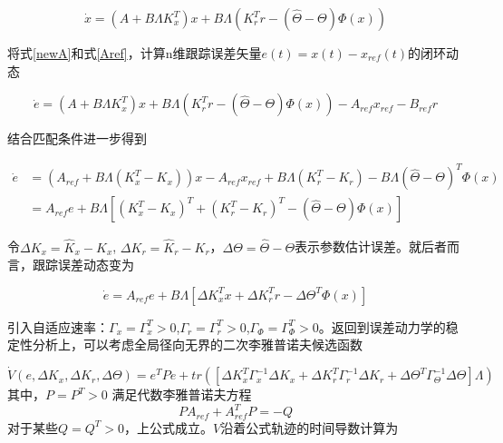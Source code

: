 \begin{equation}
\label{newA}
\dot x = (A + B\Lambda K_x^T)x + B\Lambda \left( {K_r^Tr - (\hat \Theta  - \Theta )\Phi \left( x \right)} \right)
\end{equation}

将式\ref{newA}和式\ref{Aref}，计算n维跟踪误差矢量$e(t)=x(t)-x_{ref}(t)$的闭环动态

\begin{equation}
\dot e = \left( {A + B\Lambda K_x^T} \right)x + B\Lambda \left( {K_r^Tr - (\hat \Theta  - \Theta )\Phi \left( x \right)} \right) - {A_{ref}}{x_{ref}} - {B_{ref}}r
\end{equation}

结合匹配条件进一步得到

\begin{equation}
\begin{split}
 \dot{e} &= \left( {{A_{ref}} + B\Lambda \left( {K_x^T - {K_x}} \right)} \right)x - {A_{ref}}{x_{ref}} + B\Lambda \left( {K_r^T - {K_r}} \right) - B\Lambda {\left( {\hat \Theta  - \Theta } \right)^T}\Phi \left( x \right) \\
        &= {A_{ref}}e + B\Lambda \left[ {{{\left( {K_x^T - {K_x}} \right)}^T} + {{\left( {K_r^T - {K_r}} \right)}^T} - \left( {\hat \Theta  - \Theta } \right)\Phi \left( x \right)} \right]
\end{split}
\end{equation}

令$\Delta {K_x} = {{\hat K}_x} - {K_x}$, $\Delta {K_r} = {{\hat K}_r} - {K_r}$，$\Delta {\Theta} = {{\hat \Theta}} - {\Theta}$表示参数估计误差。就后者而言，跟踪误差动态变为


\begin{equation}
\dot{e}= A_{ref}e + B \Lambda\left[\Delta K_x^T x + \Delta K_r^T r - \Delta \Theta^T \Phi(x)\right]
\end{equation}

引入自适应速率：${\Gamma _x = \Gamma _x^T} > 0$,$\Gamma _r = \Gamma _r^T>0$,$\Gamma _{\Phi} = \Gamma _{\Phi}^T > 0$。返回到误差动力学的稳定性分析上，可以考虑全局径向无界的二次李雅普诺夫候选函数

\begin{equation}
\dot V\left( e, \Delta K_x, \Delta K_r, \Delta
\Theta \right) =e^TPe +tr\left( \left[\Delta K_x^T \Gamma_x^{-1} \Delta K_x + \Delta K_r^T \Gamma_r ^{-1} \Delta K_r + \Delta \Theta^T \Gamma _{\Theta}^{-1} \Delta \Theta \right]\Lambda \right)
\end{equation}
其中，$P = P^T>0 $ 满足代数李雅普诺夫方程
\begin{equation}
PA_{ref} + A_{ref}^T P = -Q
\end{equation}
对于某些$Q=Q^T>0$，上公式成立。$V$沿着公式轨迹的时间导数计算为

